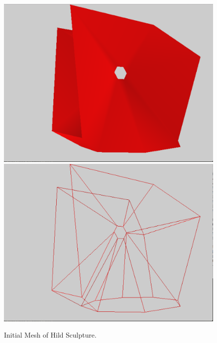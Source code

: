 \documentclass[12pt]{article}
\begin{document}
\begin{figure}[h!]
  \centering
    \includegraphics[width=\textwidth]{Hild0}
    \includegraphics[width=\textwidth]{Hild0w}
  \caption{Initial Mesh of Hild Sculpture.} \label{figure:Hild0}
\end{figure}
\end{document}
